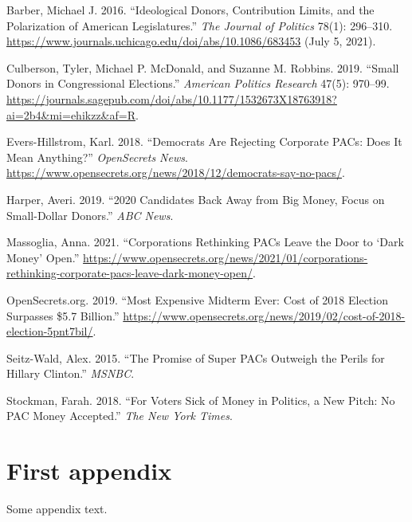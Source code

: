 \documentclass[
  12pt,
]{article}
\newlength{\cslhangindent}
\newlength{\cslentryspacingunit} %
\newenvironment{CSLReferences}[2] %
 {%
  \setlength{\parindent}{0pt}
  \ifodd #1
  \let\oldpar\par
  \def\par{\hangindent=\cslhangindent\oldpar}
  \fi
  \setlength{\parskip}{#2\cslentryspacingunit}
 }%
 {}
\begin{document}
\hypertarget{refs}{}
\begin{CSLReferences}{1}{0}
\leavevmode{}%
Barber, Michael J. 2016. {``Ideological {Donors}, {Contribution Limits}, and the {Polarization} of {American Legislatures}.''} \emph{The Journal of Politics} 78(1): 296--310. \url{https://www.journals.uchicago.edu/doi/abs/10.1086/683453} (July 5, 2021).

\leavevmode{}%
Culberson, Tyler, Michael P. McDonald, and Suzanne M. Robbins. 2019. {``Small {Donors} in {Congressional Elections}.''} \emph{American Politics Research} 47(5): 970--99. \url{https://journals.sagepub.com/doi/abs/10.1177/1532673X18763918?ai=2b4\&mi=ehikzz\&af=R}.

\leavevmode{}%
Evers-Hillstrom, Karl. 2018. {``Democrats Are Rejecting Corporate {PACs}: Does It Mean Anything?''} \emph{OpenSecrets News}. \url{https://www.opensecrets.org/news/2018/12/democrats-say-no-pacs/}.

\leavevmode{}%
Harper, Averi. 2019. {``2020 Candidates Back Away from Big Money, Focus on Small-Dollar Donors.''} \emph{ABC News}.

\leavevmode{}%
Massoglia, Anna. 2021. {``Corporations Rethinking {PACs} Leave the Door to {`Dark Money'} Open.''} \url{https://www.opensecrets.org/news/2021/01/corporations-rethinking-corporate-pacs-leave-dark-money-open/}.

\leavevmode{}%
OpenSecrets.org. 2019. {``Most Expensive Midterm Ever: Cost of 2018 Election Surpasses \$5.7 Billion.''} \url{https://www.opensecrets.org/news/2019/02/cost-of-2018-election-5pnt7bil/}.

\leavevmode{}%
Seitz-Wald, Alex. 2015. {``The Promise of Super {PACs} Outweigh the Perils for {Hillary Clinton}.''} \emph{MSNBC}.

\leavevmode{}%
Stockman, Farah. 2018. {``For {Voters Sick} of {Money} in {Politics}, a {New Pitch}: No {PAC Money Accepted}.''} \emph{The New York Times}.

\end{CSLReferences}

\hypertarget{appendix-appendix}{%
\appendix}


\hypertarget{first-appendix}{%
\section{First appendix}\label{first-appendix}}

Some appendix text.
\end{document}
